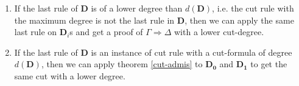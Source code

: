 \documentclass[a4paper, 12pt]{paper}
\begin{document}
\begin{enumerate}[label=\Roman*]
	\item If the last rule of $\mathbf{D}$ is of a lower degree than $d(\mathbf{D})$, i.e. the cut rule with the maximum degree is not the last rule in $\mathbf{D}$, then we can apply the same last rule on $\mathbf{D}_i$s and get a proof of $\Gamma \Rightarrow \Delta$ with a lower cut-degree.
	
	\item If the last rule of $\mathbf{D}$ is an instance of cut rule with a cut-formula of degree $d(\mathbf{D})$, then we can apply theorem \ref{cut-admis} to $\mathbf{D_0}$ and $\mathbf{D_1}$ to get the same cut with a lower degree.
\end{enumerate}
\end{document}
